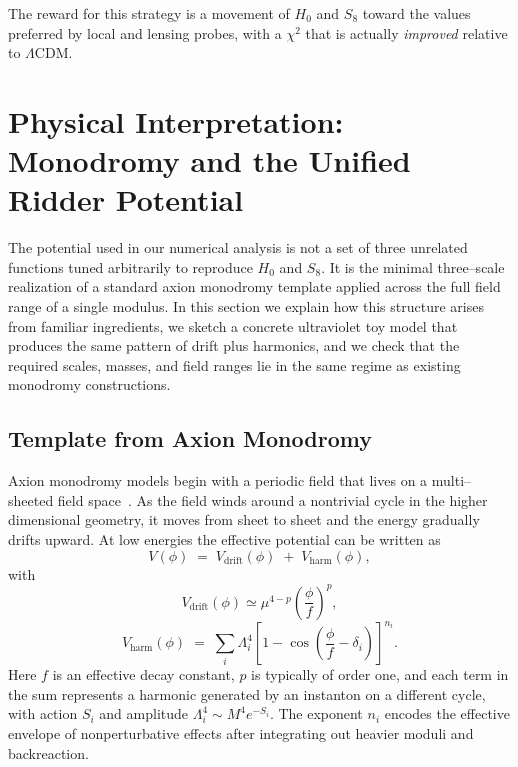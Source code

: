 \documentclass[a4paper,11pt]{article}
\begin{document}
The reward for this strategy is a movement of $H_0$ and $S_8$ toward the values preferred by local and lensing probes, with a $\chi^2$ that is actually \emph{improved} relative to $\Lambda$CDM.


\section{Physical Interpretation: Monodromy and the Unified Ridder Potential}

The potential used in our numerical analysis is not a set of three unrelated functions tuned arbitrarily to reproduce $H_0$ and $S_8$. It is the minimal three–scale realization of a standard axion monodromy template applied across the full field range of a single modulus. In this section we explain how this structure arises from familiar ingredients, we sketch a concrete ultraviolet toy model that produces the same pattern of drift plus harmonics, and we check that the required scales, masses, and field ranges lie in the same regime as existing monodromy constructions.


\subsection{Template from Axion Monodromy}
\label{sec:monodromy_template}

Axion monodromy models begin with a periodic field that lives on a multi–sheeted field space~\cite{Silverstein_Westphal, McAllister_monodromy}. As the field winds around a nontrivial cycle in the higher dimensional geometry, it moves from sheet to sheet and the energy gradually drifts upward. At low energies the effective potential can be written as
\begin{equation}
    V(\phi) \;=\; V_{\text{drift}}(\phi) \;+\; V_{\text{harm}}(\phi),
\end{equation}
with
\begin{equation}
    V_{\text{drift}}(\phi) \simeq \mu^{4-p} \left(\frac{\phi}{f}\right)^{p},
\end{equation}
\begin{equation}
    V_{\text{harm}}(\phi) \;=\; \sum_i \Lambda_i^4 \left[1 - \cos\!\left(\frac{\phi}{f} - \delta_i\right)\right]^{n_i}.
\end{equation}
Here $f$ is an effective decay constant, $p$ is typically of order one, and each term in the sum represents a harmonic generated by an instanton on a different cycle, with action $S_i$ and amplitude $\Lambda_i^4 \sim M^4 e^{-S_i}$. The exponent $n_i$ encodes the effective envelope of nonperturbative effects after integrating out heavier moduli and backreaction.
\end{document}
